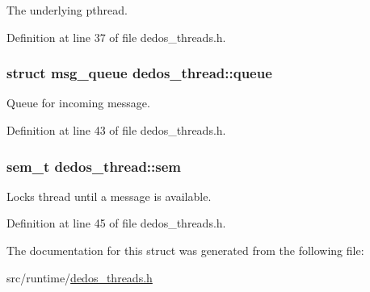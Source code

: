 The underlying pthread. 



Definition at line 37 of file dedos\-\_\-threads.\-h.

\hypertarget{structdedos__thread_ace61dc188bd6d8018126c508b1a42493}{
\subsubsection[{queue}]{\setlength{\rightskip}{0pt plus 5cm}struct {\bf msg\-\_\-queue} dedos\-\_\-thread\-::queue}}\label{structdedos__thread_ace61dc188bd6d8018126c508b1a42493}


Queue for incoming message. 



Definition at line 43 of file dedos\-\_\-threads.\-h.

\hypertarget{structdedos__thread_ababe14eb9fbd46f21932e27b04785973}{
\subsubsection[{sem}]{\setlength{\rightskip}{0pt plus 5cm}sem\-\_\-t dedos\-\_\-thread\-::sem}}\label{structdedos__thread_ababe14eb9fbd46f21932e27b04785973}


Locks thread until a message is available. 



Definition at line 45 of file dedos\-\_\-threads.\-h.



The documentation for this struct was generated from the following file\-:\begin{DoxyCompactItemize}
\item 
src/runtime/\hyperlink{dedos__threads_8h}{dedos\-\_\-threads.\-h}\end{DoxyCompactItemize}
